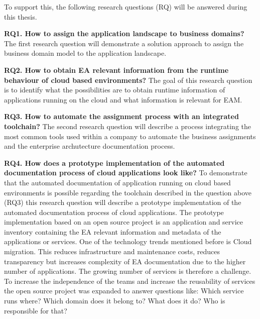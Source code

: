 To support this, the following research questions (RQ) will be answered during this thesis.

\textbf{RQ1. How to assign the application landscape to business domains?}
The first research question will demonstrate a solution approach to assign the business domain model to the application landscape.

\textbf{RQ2. How to obtain EA relevant information from the runtime behaviour of cloud based environments?}
The goal of this research question is to identify what the possibilities are to obtain runtime information of applications running on the cloud and what information is relevant for EAM.

\textbf{RQ3. How to automate the assignment process with an integrated toolchain?}
The second research question will describe a process integrating the most common tools used within a company to automate the business assignments and the enterprise archutecture documentation process.

\textbf{RQ4. How does a prototype implementation of the automated documentation process of cloud applications look like?}
To demonstrate that the automated documentation of application running on cloud based environments is possible regarding the toolchain described in the question above (RQ3) this research question will describe a prototype implementation of the automated documentation process of cloud applications. The prototype implementation based on an open source project is an application and service inventory containing the EA relevant information and metadata of the applications or services. One of the technology trends mentioned before is Cloud migration. This reduces infrastructure and maintenance costs, reduces transparency but increases complexity of EA documentation due to the higher number of applications. The growing number of services is therefore a challenge. To increase the independence of the teams and increase the reusability of services the open source project was expanded to answer questions like: Which service runs where? Which domain does it belong to? What does it do? Who is responsible for that?


